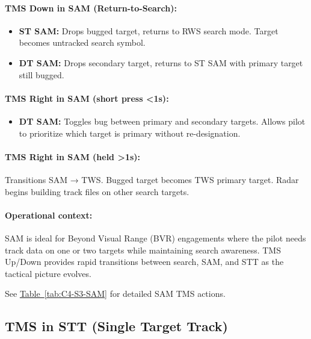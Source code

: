 \documentclass[11pt, a4paper, twoside]{report}
\newcommand{\tabref}[1]{\hyperref[#1]{Table~\ref*{#1}}}
\begin{document}
\paragraph{TMS Down in SAM (Return-to-Search):}
\begin{itemize}
    \item \textbf{ST SAM:} Drops bugged target, returns to RWS search mode. Target becomes untracked search symbol.
    \item \textbf{DT SAM:} Drops secondary target, returns to ST SAM with primary target still bugged.
\end{itemize}

\paragraph{TMS Right in SAM (short press <1s):}
\begin{itemize}
    \item \textbf{DT SAM:} Toggles bug between primary and secondary targets. Allows pilot to prioritize which target is primary without re-designation.
\end{itemize}

\paragraph{TMS Right in SAM (held >1s):}
Transitions SAM → TWS. Bugged target becomes TWS primary target. Radar begins building track files on other search targets.

\paragraph{Operational context:}
SAM is ideal for Beyond Visual Range (BVR) engagements where the pilot needs track data on one or two targets while maintaining search awareness. TMS Up/Down provides rapid transitions between search, SAM, and STT as the tactical picture evolves.

See \tabref{tab:C4-S3-SAM} for detailed SAM TMS actions.

\subsection{TMS in STT (Single Target Track)}
\label{sec:C4-S3-S2}
\end{document}
